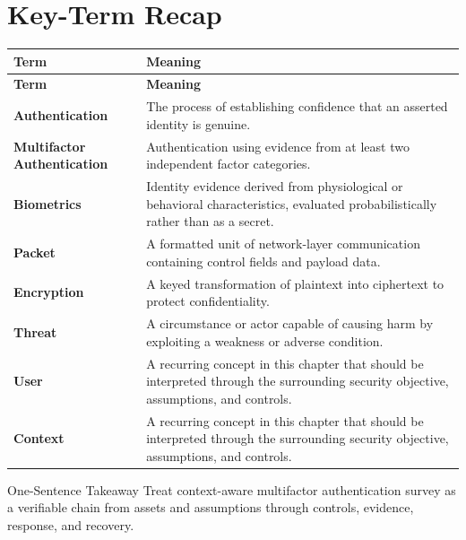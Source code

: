 \documentclass[11pt,letterpaper]{article}
\begin{document}
\section*{Key-Term Recap}
\begin{longtable}{>{\raggedright\arraybackslash}p{}>{\raggedright\arraybackslash}p{}}
\toprule\rowcolor{Navy}\color{white}\textbf{Term} & \color{white}\textbf{Meaning}\\\midrule
\endfirsthead
\toprule\rowcolor{Navy}\color{white}\textbf{Term} & \color{white}\textbf{Meaning}\\\midrule
\endhead
\textbf{Authentication} & The process of establishing confidence that an asserted identity is genuine. \\\midrule
\textbf{Multifactor Authentication} & Authentication using evidence from at least two independent factor categories. \\\midrule
\textbf{Biometrics} & Identity evidence derived from physiological or behavioral characteristics, evaluated probabilistically rather than as a secret. \\\midrule
\textbf{Packet} & A formatted unit of network-layer communication containing control fields and payload data. \\\midrule
\textbf{Encryption} & A keyed transformation of plaintext into ciphertext to protect confidentiality. \\\midrule
\textbf{Threat} & A circumstance or actor capable of causing harm by exploiting a weakness or adverse condition. \\\midrule
\textbf{User} & A recurring concept in this chapter that should be interpreted through the surrounding security objective, assumptions, and controls. \\\midrule
\textbf{Context} & A recurring concept in this chapter that should be interpreted through the surrounding security objective, assumptions, and controls. \\\midrule
\bottomrule
\end{longtable}
\begin{CornellExamBox}{One-Sentence Takeaway}
Treat context-aware multifactor authentication survey as a verifiable chain from assets and assumptions through controls, evidence, response, and recovery.
\end{CornellExamBox}
\end{document}
